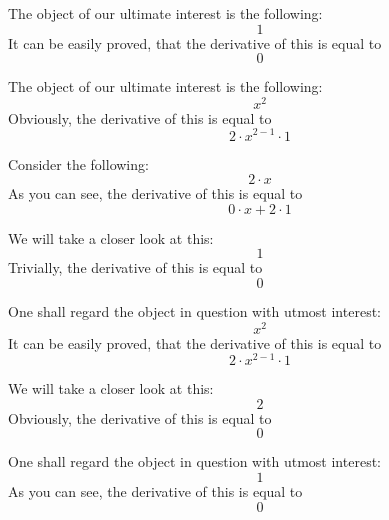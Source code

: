 \documentclass{article}
\begin{document}
The object of our ultimate interest is the following:
\begin{equation}
1 
\end{equation}
It can be easily proved, that the derivative of this is equal to
\begin{equation}
0 
\end{equation}

The object of our ultimate interest is the following:
\begin{equation}
x ^{2 } 
\end{equation}
Obviously, the derivative of this is equal to
\begin{equation}
2 \cdot x ^{2 - 1 } \cdot 1 
\end{equation}

Consider the following:
\begin{equation}
2 \cdot x 
\end{equation}
As you can see, the derivative of this is equal to
\begin{equation}
0 \cdot x + 2 \cdot 1 
\end{equation}

We will take a closer look at this:
\begin{equation}
1 
\end{equation}
Trivially, the derivative of this is equal to
\begin{equation}
0 
\end{equation}

One shall regard the object in question with utmost interest:
\begin{equation}
x ^{2 } 
\end{equation}
It can be easily proved, that the derivative of this is equal to
\begin{equation}
2 \cdot x ^{2 - 1 } \cdot 1 
\end{equation}

We will take a closer look at this:
\begin{equation}
2 
\end{equation}
Obviously, the derivative of this is equal to
\begin{equation}
0 
\end{equation}

One shall regard the object in question with utmost interest:
\begin{equation}
1 
\end{equation}
As you can see, the derivative of this is equal to
\begin{equation}
0 
\end{equation}
\end{document}
